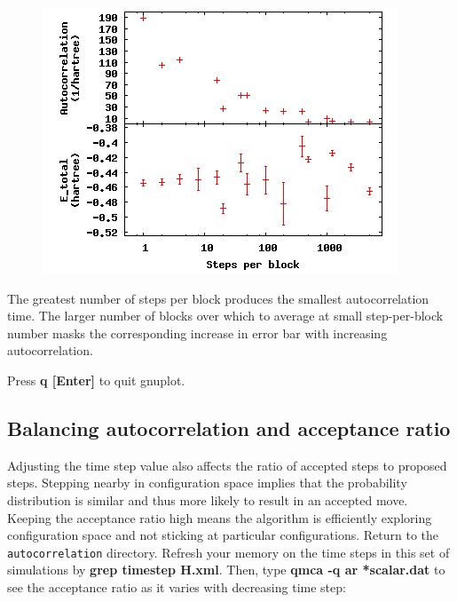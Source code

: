 \FloatBarrier
\begin{figure}[ht!]
\begin{center}
\includegraphics[trim = 0mm 0mm 0mm 0mm, clip,width=0.75\columnwidth]{./figures/lab_qmc_statistics_blocking2}
\end{center}
\end{figure}
\FloatBarrier


The greatest number of steps per block produces the smallest autocorrelation
time.  The larger number of blocks over which to average at small
step-per-block number masks the corresponding increase in error bar with
increasing autocorrelation.

Press \textbf{q [Enter]} to quit gnuplot.

\subsection{Balancing autocorrelation and acceptance ratio}

Adjusting the time step value also affects the ratio of accepted steps to
proposed steps.  Stepping nearby in configuration space implies that the
probability distribution is similar and thus more likely to result in an
accepted move.  Keeping the acceptance ratio high means the algorithm is
efficiently exploring configuration space and not sticking at particular
configurations.  Return to the \texttt{autocorrelation} directory.  Refresh your
memory on the time steps in this set of simulations by \textbf{grep timestep
H.xml}. Then, type \textbf{qmca -q ar *scalar.dat} to see the acceptance ratio
as it varies with decreasing time step:


